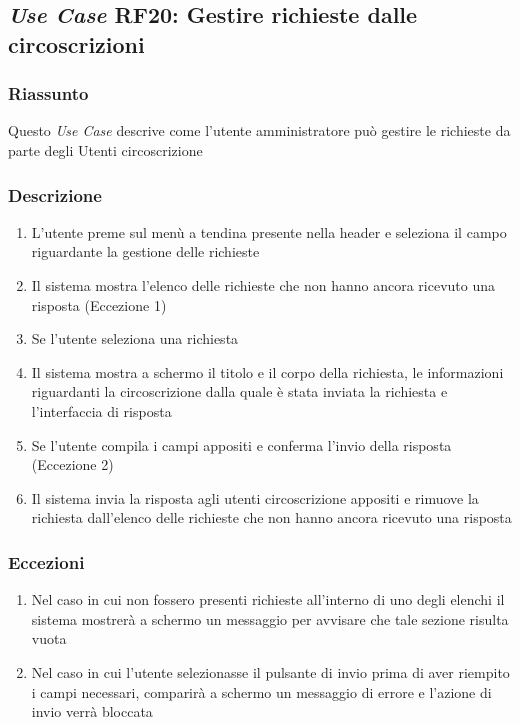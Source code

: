     \subsection{\textit{Use Case} RF20: Gestire richieste dalle circoscrizioni}
        \subsubsection{Riassunto}
            Questo \textit{Use Case} descrive come l'utente amministratore può gestire le richieste da parte degli Utenti circoscrizione
        \subsubsection{Descrizione}
            \begin{enumerate}
                \item L'utente preme sul menù a tendina presente nella header e seleziona il campo riguardante la gestione delle richieste
                \item Il sistema mostra l'elenco delle richieste che non hanno ancora ricevuto una risposta (Eccezione 1)
                \item Se l'utente seleziona una richiesta
                \item Il sistema mostra a schermo il titolo e il corpo della richiesta, le informazioni riguardanti la circoscrizione dalla quale è stata inviata la richiesta e l'interfaccia di risposta
                \item Se l'utente compila i campi appositi e conferma l'invio della risposta (Eccezione 2)
                \item Il sistema invia la risposta agli utenti circoscrizione appositi e rimuove la richiesta dall'elenco delle richieste che non hanno ancora ricevuto una risposta
            \end{enumerate}
        \subsubsection{Eccezioni}
            \begin{enumerate}
                \item Nel caso in cui non fossero presenti richieste all'interno di uno degli elenchi il sistema mostrerà a schermo un messaggio per avvisare che tale sezione risulta vuota
                \item Nel caso in cui l'utente selezionasse il pulsante di invio prima di aver riempito i campi necessari, comparirà a schermo un messaggio di errore e l'azione di invio verrà bloccata
            \end{enumerate}


